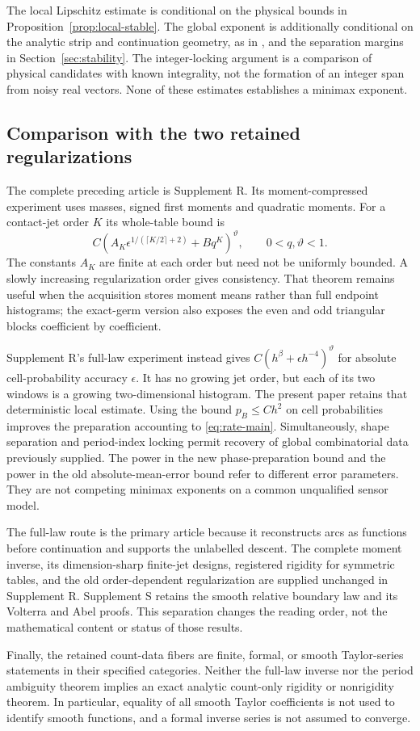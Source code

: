 The local Lipschitz estimate is conditional on the physical bounds in
Proposition~\ref{prop:local-stable}. The global exponent is additionally
conditional on the analytic strip and continuation geometry, as in
\cite{Trefethen}, and the separation margins in Section~\ref{sec:stability}.
The integer-locking argument is a comparison of physical candidates with
known integrality, not the formation of an integer span from noisy real
vectors. None of these estimates establishes a minimax exponent.

\subsection{Comparison with the two retained regularizations}
The complete preceding article is Supplement R. Its moment-compressed
experiment uses masses, signed first moments and quadratic moments.
For a contact-jet order $K$ its whole-table bound is
\[
 C\left(A_K\epsilon^{1/(\lceil K/2\rceil+2)}+Bq^K\right)^{\vartheta},
                       \qquad 0<q,\vartheta<1.
\]
The constants $A_K$ are finite at each order but need not be uniformly
bounded. A slowly increasing regularization order gives consistency.
That theorem remains useful when the acquisition stores moment means
rather than full endpoint histograms; the exact-germ version also exposes
the even and odd triangular blocks coefficient by coefficient.

Supplement R's full-law experiment instead gives
$C(h^\beta+\epsilon h^{-4})^\vartheta$ for absolute cell-probability
accuracy $\epsilon$. It has no growing jet order, but each of its two
windows is a growing two-dimensional histogram. The present paper retains
that deterministic local estimate. Using the bound $p_B\le Ch^2$ on
cell probabilities improves the preparation accounting to
\eqref{eq:rate-main}. Simultaneously, shape separation and period-index
locking permit recovery of global combinatorial data previously supplied.
The power in the new phase-preparation bound and the power in the old
absolute-mean-error bound refer to different error parameters. They are
not competing minimax exponents on a common unqualified sensor model.

The full-law route is the primary article because it reconstructs arcs
as functions before continuation and supports the unlabelled descent.
The complete moment inverse, its dimension-sharp finite-jet designs,
registered rigidity for symmetric tables, and the old order-dependent
regularization are supplied unchanged in Supplement R. Supplement S
retains the smooth relative boundary law and its Volterra and Abel
proofs. This separation changes the reading order, not the mathematical
content or status of those results.

Finally, the retained count-data fibers are finite, formal, or smooth
Taylor-series statements in their specified categories. Neither the
full-law inverse nor the period ambiguity theorem implies an exact
analytic count-only rigidity or nonrigidity theorem. In particular,
equality of all smooth Taylor coefficients is not used to identify
smooth functions, and a formal inverse series is not assumed to converge.
